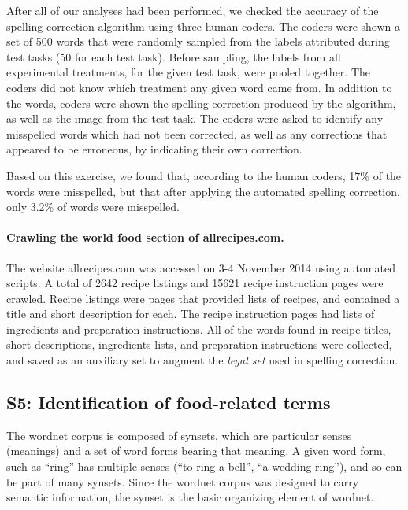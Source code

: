 \documentclass[12pt]{article}
\begin{document}
	After all of our analyses had been performed, we checked the accuracy of 
	the spelling correction algorithm using three human coders.  The coders
	were shown a set of 
	500 words that were randomly sampled from the labels attributed during 
	test tasks (50 for each test task).  Before sampling, the labels from all
	experimental treatments, for the given test task, were pooled together.
	The coders did not know which treatment any given word came from.  
	In addition to the words, coders were shown the spelling correction 
	produced by the algorithm, as well as the image from the test task.
	The coders were asked to identify any misspelled words which had not 
	been corrected, as well as any corrections that appeared to be erroneous,
	by indicating their own correction.

	Based on this exercise, we found that, according to the human coders,
	17\% of the words were misspelled, but that after applying the 
	automated spelling correction, only 3.2\% of words were misspelled.

	\paragraph{Crawling the world food section of allrecipes.com.}
	The website allrecipes.com was accessed on 3-4 November 2014 using 
	automated scripts.  A total of 2642 recipe listings and 15621 recipe
	instruction pages were crawled.  Recipe listings were pages that provided 
	lists of recipes, and contained a title and short description for each.  
	The recipe instruction pages had lists of ingredients and preparation 
	instructions.  All of the words found in recipe titles, short
	descriptions, ingredients lists, and preparation instructions were
	collected, and saved as an auxiliary set to augment the \textit{legal set}
	used in spelling correction.
	


\subsection*{S5: Identification of food-related terms}
The wordnet corpus is composed of synsets, which are particular senses 
(meanings) and a set of word forms bearing that meaning. A given word form, 
such as ``ring'' has multiple senses (``to ring a bell'', ``a wedding ring''), 
and so can be part of many synsets.  Since the wordnet corpus was designed
to carry semantic information, the synset is the basic organizing element
of wordnet.
\end{document}
